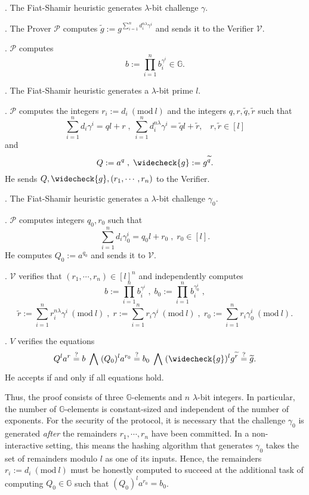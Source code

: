 \documentclass[11pt, lettersize, notitlepage, leqno, footskip=0.6cm]{article}
\newcommand{\slim}{\sum\limits}
\newcommand{\wti}{\widetilde}
\newcommand{\mc}{\mathcal}
\newcommand{\mb}{\mathbb}
\newcommand{\lam}{\lambda}
\newcommand{\lamb}{\lambda}
\newcommand{\weck}{\widecheck}
\newcommand{\mP}{\mc{P}}
\newcommand{\V}{\mc{V}}
\newcommand{\vs}{\vspace{-0.15cm}}
\newcommand{\noin}{\noindent}
\newcommand{\sta}{\stackrel{?}{=}}
\newcommand{\Mod}[1]{\ (\mathrm{mod}\ #1)}
\numberwithin{equation}{section}
\begin{document}
\begin{prf1} . The Fiat-Shamir heuristic generates $\lamb$-bit challenge $\gamma$.

\noin 2. The Prover $\mc{P}$ computes $\wti{g}:= g^{\sum\limits_{i=1}^n d_i^{n\lam}\gamma^i}$ and sends it to the Verifier $\mc{V}$.

. $\mc{P}$ computes \vs $$b:= \prod\limits_{i=1}^n b_i^{\gamma^i} \in \mb{G}.$$

\noin 4. The Fiat-Shamir heuristic generates a $\lam$-bit prime $l$. 

. $\mc{P}$ computes the integers $r_i:= d_i\Mod{l}$ and the integers $q, r,\wti{q},\wti{r}$ such that \vs $$\slim_{i=1}^n d_i\gamma^i = ql+r\;,\; \slim_{i=1}^n d_i^{n\lam}\gamma^i = \wti{q}l+\wti{r},\;\;\;r,\wti{r}\in[l]$$ and \vs $$Q:= a^q\;,\; \weck{g}:= g^{\wti{q}}.$$ He sends $Q, \weck{g}, (r_1,\cdots,r_n)$ to the Verifier.

\noin 6. The Fiat-Shamir heuristic generates a $\lam$-bit challenge $\gamma_0$.

\noin 7. $\mP$ computes integers $q_0, r_0$ such that \vs $$\slim_{i=1}^n d_i\gamma_0^i = q_0l+r_0\;,\;r_0\in[l] .$$ He computes $Q_0:= a^{q_0}$ and sends it to $\V.$

. $\mc{V}$ verifies that $(r_1,\cdots,r_n)\in [l]^n$ and independently computes \vs $$b := \prod\limits_{i=1}^n b_i^{\gamma^i}\;,\;b_0 := \prod\limits_{i=1}^n b_i^{\gamma_0^i}\;,$$ \vspace{-0.2cm} $$\wti{r}:= \slim_{i=1}^n r_i^{n\lam}\gamma^i\Mod{l}\;,\;r:= \slim_{i=1}^n r_i\gamma^i\Mod{l}\;,\;r_0:=\slim_{i=1}^n r_i\gamma_0^i\Mod{l}.$$ 

\noin 9. $V$ verifies the equations \vs $$Q^la^r\sta b\;\bigwedge\;(Q_0)^la^{r_0}\sta b_0\;\bigwedge\; (\weck{g})^lg^{\wti{r}}\sta\wti{g}.$$ He accepts if and only if all equations hold.\end{prf1}

Thus, the proof consists of three $\mb{G}$-elements and $n$ $\lam$-bit integers. In particular, the number of $\mb{G}$-elements is constant-sized and independent of the number of exponents. For the security of the protocol, it is necessary that the challenge $\gamma_0$ is generated \textit{after} the remainders $r_1,\cdots,r_n$ have been committed. In a non-interactive setting, this means the hashing algorithm that generates $\gamma_0$ takes the set of remainders modulo $l$ as one of its inputs. Hence, the remainders $r_i:= d_i\Mod{l}$ must be honestly computed to succeed at the additional task of computing $Q_0\in\mb{G}$ such that $(Q_0)^la^{r_0} = b_0$.
\end{document}
